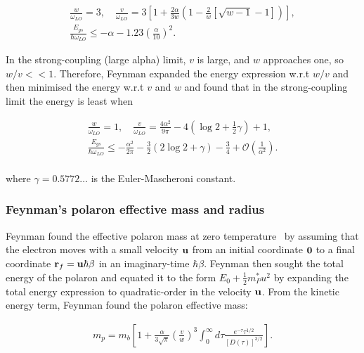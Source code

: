 \begin{equation}
\begin{gathered}
    \label{eqn:weak_gs_feynman}
    \frac{w}{\omega_{LO}} = 3, \quad \frac{v}{\omega_{LO}} = 3 \left[ 1 + \frac{2\alpha}{3w} \left(1 -\frac{2}{w} \left[ \sqrt{w-1}-1 \right] \right) \right] ,\\
    \frac{E_{gs}}{\hbar\omega_{LO}} \leq -\alpha - 1.23 \left(\frac{\alpha}{10}\right)^2 .
\end{gathered}
\end{equation}

In the strong-coupling (large alpha) limit, $v$ is large, and $w$ approaches one, so $w / v << 1$. Therefore, Feynman expanded the energy expression w.r.t $w / v$ and then minimised the energy w.r.t $v$ and $w$ and found that in the strong-coupling limit the energy is least when 

\begin{equation}
\begin{gathered}
    \label{eqn:strong_gs_feynman}
    \frac{w}{\omega_{LO}} = 1, \quad \frac{v}{\omega_{LO}} = \frac{4\alpha^2}{9\pi} - 4\left( \log2 + \frac{1}{2} \gamma \right) + 1 , \\
    \frac{E_{gs}}{\hbar\omega_{LO}} \leq -\frac{\alpha^2}{2\pi} - \frac{3}{2}(2\log2+\gamma)-\frac{3}{4} + \mathcal{O}\left(\frac{1}{\alpha^2}\right) . \\
\end{gathered}
\end{equation}

where $\gamma = 0.5772 \dots$ is the Euler-Mascheroni constant. 

\subsubsection{Feynman's polaron effective mass and radius}
\label{subsec:2-2-2-2}

Feynman found the effective polaron mass at zero temperature~\cite{feynman_slow_1955} by assuming that the electron moves with a small velocity $\vb{u}$ from an initial coordinate $\vb{0}$ to a final coordinate $\vb{r}_f = \vb{u} \hbar\beta$ in an imaginary-time $\hbar\beta$. Feynman then sought the total energy of the polaron and equated it to the form $E_0 + \frac{1}{2}m^*_P u^2$ by expanding the total energy expression to quadratic-order in the velocity $\vb{u}$. From the kinetic energy term, Feynman found the polaron effective mass:

\begin{equation}
\begin{gathered}
    \label{eqn:mass_feynman}
    m_p = m_b \left[ 1 + \frac{\alpha}{3\sqrt{\pi}} \left(\frac{v}{w}\right)^3 \int^\infty_0 d\tau \frac{e^{-\tau} \tau^{1/2}}{\left[D(\tau)\right]^{3/2}} \right].
\end{gathered}
\end{equation}

